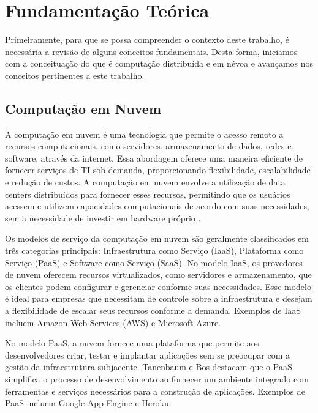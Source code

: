 \chapter{Fundamentação Teórica}\label{cap:fundamentacao_teorica}

Primeiramente, para que se possa compreender o contexto deste trabalho, é necessária a revisão de alguns conceitos fundamentais. Desta forma, iniciamos com a conceituação do que é computação distribuída e em névoa e avançamos nos conceitos pertinentes a este trabalho.

\section{Computação em Nuvem}

A computação em nuvem é uma tecnologia que permite o acesso remoto a recursos computacionais, como servidores, armazenamento de dados, redes e software, através da internet. Essa abordagem oferece uma maneira eficiente de fornecer serviços de TI sob demanda, proporcionando flexibilidade, escalabilidade e redução de custos. A computação em nuvem envolve a utilização de data centers distribuídos para fornecer esses recursos, permitindo que os usuários acessem e utilizem capacidades computacionais de acordo com suas necessidades, sem a necessidade de investir em hardware próprio \cite{tanenbaum2015}.

Os modelos de serviço da computação em nuvem são geralmente classificados em três categorias principais: Infraestrutura como Serviço (IaaS), Plataforma como Serviço (PaaS) e Software como Serviço (SaaS). No modelo IaaS, os provedores de nuvem oferecem recursos virtualizados, como servidores e armazenamento, que os clientes podem configurar e gerenciar conforme suas necessidades. Esse modelo é ideal para empresas que necessitam de controle sobre a infraestrutura e desejam a flexibilidade de escalar seus recursos conforme a demanda. Exemplos de IaaS incluem Amazon Web Services (AWS) e Microsoft Azure.

No modelo PaaS, a nuvem fornece uma plataforma que permite aos desenvolvedores criar, testar e implantar aplicações sem se preocupar com a gestão da infraestrutura subjacente. Tanenbaum e Bos destacam que o PaaS simplifica o processo de desenvolvimento ao fornecer um ambiente integrado com ferramentas e serviços necessários para a construção de aplicações. Exemplos de PaaS incluem Google App Engine e Heroku.

